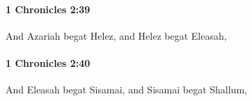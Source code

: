 		\paragraph{1 Chronicles 2:39} %
			\label{1CHRONICLES-2-39}

			And Azariah begat Helez, and Helez begat Eleasah,


		\paragraph{1 Chronicles 2:40} %
			\label{1CHRONICLES-2-40}

			And Eleasah begat Sisamai, and Sisamai begat Shallum,


